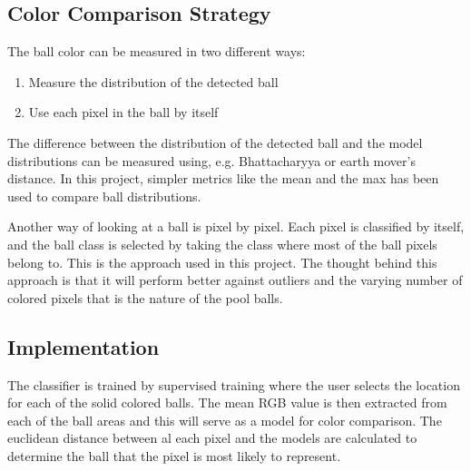 \subsection{Color Comparison Strategy}

The ball color can be measured in two different ways: 
\begin{enumerate}
  \item Measure the distribution of the detected ball
  \item Use each pixel in the ball by itself
\end{enumerate}

The difference between the distribution of the detected ball and the model distributions can be measured using, e.g. Bhattacharyya or earth mover's distance. In this project, simpler metrics like the mean and the max has been used to compare ball distributions. 

Another way of looking at a ball is pixel by pixel. Each pixel is classified by itself, and the ball class is selected by taking the class where most of the ball pixels belong to. This is the approach used in this project. The thought behind this approach is that it will perform better against outliers and the varying number of colored pixels that is the nature of the pool balls. 

\subsection{Implementation}
The classifier is trained by supervised training where the user selects the location for each of the solid colored balls. The mean RGB value is then extracted from each of the ball areas and this will serve as a model for color comparison. The euclidean distance between al each pixel and the models are calculated to determine the ball that the pixel is most likely to represent.

